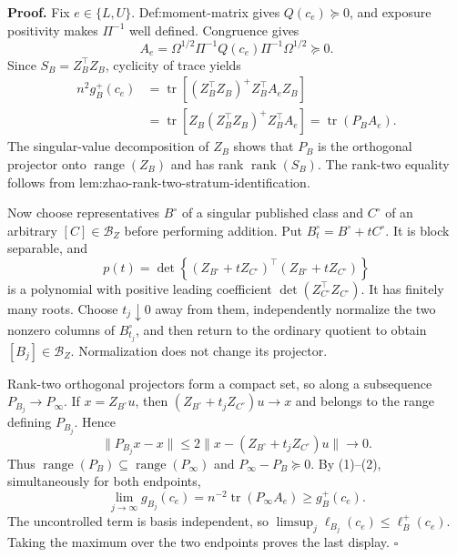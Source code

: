 \textbf{Proof.}
Fix \(e\in\{L,U\}\).  Def:moment-matrix gives \(Q(c_e)\succeq0\), and exposure positivity makes \(\Pi^{-1}\) well defined.  Congruence gives
\[
 A_e=\Omega^{1/2}\Pi^{-1}Q(c_e)\Pi^{-1}\Omega^{1/2}\succeq0.
 \tag{1}
\]
Since \(S_B=Z_B^{\top}Z_B\), cyclicity of trace yields
\[
 \begin{aligned}
 n^2g_B^+(c_e)
 &=\operatorname{tr}\!\left[(Z_B^{\top}Z_B)^+Z_B^{\top}A_eZ_B\right]\\
 &=\operatorname{tr}\!\left[Z_B(Z_B^{\top}Z_B)^+Z_B^{\top}A_e\right]
 =\operatorname{tr}(P_BA_e).
 \end{aligned}
 \tag{2}
\]
The singular-value decomposition of \(Z_B\) shows that \(P_B\) is the orthogonal projector onto \(\operatorname{range}(Z_B)\) and has rank \(\operatorname{rank}(S_B)\).  The rank-two equality follows from lem:zhao-rank-two-stratum-identification.

Now choose representatives \(B^\circ\) of a singular published class and \(C^\circ\) of an arbitrary \([C]\in\mathcal B_Z\) before performing addition.  Put \(B_t^\circ=B^\circ+tC^\circ\).  It is block separable, and
\[
 p(t)=\det\!\left\{(Z_{B^\circ}+tZ_{C^\circ})^{\top}(Z_{B^\circ}+tZ_{C^\circ})\right\}
\]
is a polynomial with positive leading coefficient \(\det(Z_{C^\circ}^{\top}Z_{C^\circ})\).  It has finitely many roots.  Choose \(t_j\downarrow0\) away from them, independently normalize the two nonzero columns of \(B_{t_j}^\circ\), and then return to the ordinary quotient to obtain \([B_j]\in\mathcal B_Z\).  Normalization does not change its projector.

Rank-two orthogonal projectors form a compact set, so along a subsequence \(P_{B_j}\to P_\infty\).  If \(x=Z_{B^\circ}u\), then \((Z_{B^\circ}+t_jZ_{C^\circ})u\to x\) and belongs to the range defining \(P_{B_j}\).  Hence
\[
 \lVert P_{B_j}x-x\rVert
 \le2\lVert x-(Z_{B^\circ}+t_jZ_{C^\circ})u\rVert\longrightarrow0.
\]
Thus \(\operatorname{range}(P_B)\subseteq\operatorname{range}(P_\infty)\) and \(P_\infty-P_B\succeq0\).  By (1)--(2), simultaneously for both endpoints,
\[
 \lim_{j\to\infty}g_{B_j}(c_e)
 =n^{-2}\operatorname{tr}(P_\infty A_e)
 \ge g_B^+(c_e).
\]
The uncontrolled term is basis independent, so \(\limsup_j\ell_{B_j}(c_e)\le\ell_B^+(c_e)\).  Taking the maximum over the two endpoints proves the last display. \(\square\)